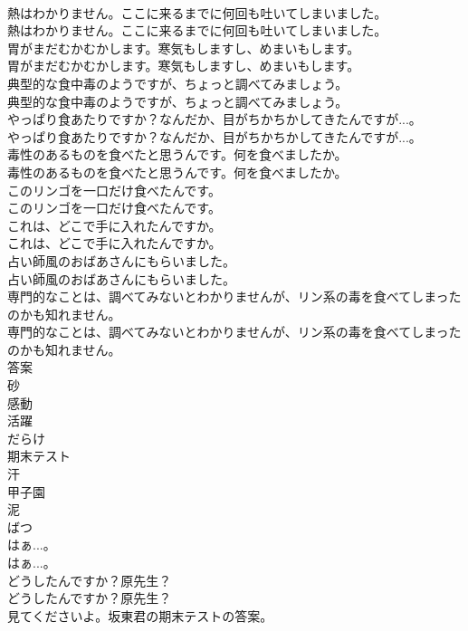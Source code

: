 \documentclass[8pt]{extreport}
\begin{document}
\begin{CJK}{UTF8}{min}
\\	熱はわかりません。ここに来るまでに何回も吐いてしまいました。	
\\	熱はわかりません。ここに来るまでに何回も吐いてしまいました。 
\\	胃がまだむかむかします。寒気もしますし、めまいもします。	
\\	胃がまだむかむかします。寒気もしますし、めまいもします。 
\\	典型的な食中毒のようですが、ちょっと調べてみましょう。	
\\	典型的な食中毒のようですが、ちょっと調べてみましょう。 
\\	やっぱり食あたりですか？なんだか、目がちかちかしてきたんですが...。	
\\	やっぱり食あたりですか？なんだか、目がちかちかしてきたんですが...。 
\\	毒性のあるものを食べたと思うんです。何を食べましたか。	
\\	毒性のあるものを食べたと思うんです。何を食べましたか。 
\\	このリンゴを一口だけ食べたんです。	
\\	このリンゴを一口だけ食べたんです。 
\\	これは、どこで手に入れたんですか。	
\\	これは、どこで手に入れたんですか。 
\\	占い師風のおばあさんにもらいました。	
\\	占い師風のおばあさんにもらいました。 
\\	専門的なことは、調べてみないとわかりませんが、リン系の毒を食べてしまったのかも知れません。	
\\	専門的なことは、調べてみないとわかりませんが、リン系の毒を食べてしまったのかも知れません。 
\\	答案
\\	砂
\\	感動
\\	活躍
\\	だらけ
\\	期末テスト
\\	汗
\\	甲子園
\\	泥
\\	ばつ
\\	はぁ...。	
\\	はぁ...。 
\\	どうしたんですか？原先生？	
\\	どうしたんですか？原先生？ 
\\	見てくださいよ。坂東君の期末テストの答案。	

\end{CJK}
\end{document}
